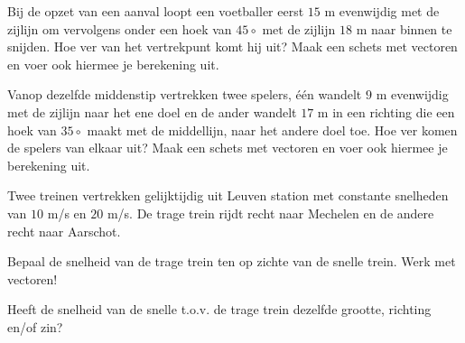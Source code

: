 \documentclass{ximera}
\begin{document}
	\author{Bart Lambregs en Vincent Gellens}
    \xmsource\xmuitleg



\begin{exercise}
Bij de opzet van een aanval loopt een voetballer eerst \(15\) m evenwijdig met de zijlijn om vervolgens onder een hoek van \(45\circ\) met de zijlijn \(18\) m naar binnen te snijden. 
Hoe ver van het vertrekpunt komt hij uit? Maak een schets met vectoren en voer ook hiermee je berekening uit.
\end{exercise}

\begin{exercise}
Vanop dezelfde middenstip vertrekken twee spelers, één wandelt \(9\) m evenwijdig met de zijlijn naar het ene doel en de ander wandelt \(17\) m in een richting die een hoek van \(35\circ\) maakt met de middellijn, naar het andere doel toe. Hoe ver komen de spelers van elkaar uit? Maak een schets met vectoren en voer ook hiermee je berekening uit.
\end{exercise}


\begin{exercise}
	Twee treinen vertrekken gelijktijdig uit Leuven station met constante snelheden van \(10\) m/s en \(20\) m/s. 
	De trage trein rijdt recht naar Mechelen en de andere recht naar Aarschot. 
	
	\begin{image}[0.4\textwidth]
	\end{image}

	\begin{question}
		Bepaal de snelheid van de trage trein ten op zichte van de snelle trein. Werk met vectoren!
	\end{question}

	\begin{question}
		Heeft de snelheid van de snelle t.o.v. de trage trein dezelfde grootte, richting en/of zin?
	\end{question}
	\end{exercise}
\end{document}
